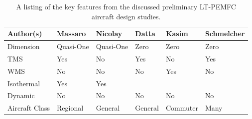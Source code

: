 \begin{center}
	\begin{table}
		\caption{A listing of the key features from the discussed preliminary LT-PEMFC aircraft design studies.}
		\begin{tabularx}{\linewidth}{Y Y Y Y Y Y}
			\toprule
			Author(s)      & Massaro \etal & Nicolay \etal & Datta   & Kasim \etal & Schmelcher \\
			\midrule
			Dimension      & Quasi-One     & Quasi-One     & Zero    & Zero        & Zero       \\
			TMS            & Yes           & No            & Yes     & No          & Yes        \\
			WMS            & No            & No            & No      & Yes         & No         \\
			Isothermal     & Yes           & Yes           &         &             &            \\
			Dynamic        & No            & No            & No      & No          & No         \\
			Aircraft Class & Regional      & General       & General & Commuter    & Many       \\
			\bottomrule
		\end{tabularx}
		\label{tab:studies}
	\end{table}
\end{center}
